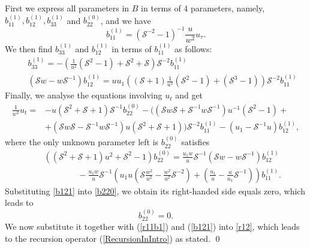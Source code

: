 \documentclass[fleqn,11pt,twoside]{article}
\makeatletter
\newcommand\cS{{\mathcal S}}
\renewenvironment{proof}[1][\proofname]{\par
  \normalfont
  \topsep6\p@\@plus6\p@ \trivlist
  \item[\hskip\labelsep\textbf{%
    #1\@addpunct{.}}]\ignorespaces
}{%
  \qed\endtrivlist
}
\theoremstyle{definition}
\makeatother
\begin{document}
\begin{proof}
First we express all parameters in $B$ in terms of 4 parameters, namely,
$b^{(1)}_{11},  b^{(1)}_{12},  b^{(1)}_{33}$ and $b^{(0)}_{22} $, and we have
\begin{equation}
 b^{(1)}_{11}= (\mathcal{S}^{-2}-1)^{-1}\frac{u}{w^2}u_\tau. \label{r11b1}
\end{equation}
We then find
$b^{(1)}_{33}$ and $b^{(1)}_{12}$ in terms of $b^{(1)}_{11}$ as follows:
		\begin{eqnarray}
&& b^{(1)}_{    33} =-\left(\frac{1}{u^2}
(\mathcal{S}^2-1)+\mathcal{S}^2+\mathcal{S}\right) \mathcal{S}^{-2} b^{(1)}_{11}\label{r11bis}\\
&&\left(\mathcal{S} w- w \mathcal{S}^{-1} \right)
b^{(1)}_{    1 2}= u u_1 \left( \left(\mathcal{S}+1\right)
\frac{1}{u^2}\left(\mathcal{S}^2-1\right)+\left(\mathcal{S}^3-1\right)\right)
\mathcal{S}^{-2} b^{(1)}_{11}\label{b121}
		\end{eqnarray}
Finally, we analyse the equations involving $u_t$ and get
		\begin{equation}
			\begin{split}
				\frac{1}{w^2} u_t= & -u\left(\mathcal{S}
^2+\mathcal{S} +1\right) \mathcal{\mathcal{S} }^{-1} b^{(0)}_{    22}   -\Big(\left(\cS w \cS + \cS^{-1} w \cS^{-1}\right)u^{-1} \left(\cS^2 -1\right)+\\ & + \left(\cS w \cS - \cS^{-1} w \cS^{-1}\right) u \left(\cS^2 + \cS + 1 \right)\Big)
\mathcal{\mathcal{S} }^{-2} b^{(1)}_{11} -\left(
{u_1}- \mathcal{S}^{-1} u\right) b^{(1)}_{    12},
			\end{split}
			\label{r12}
		\end{equation}
where the only unknown parameter left is $b^{(0)}_{22}$ satisfies
		\begin{eqnarray}
				&& \left(\left(\mathcal{S}^2+\mathcal{S}+1\right)
u^2+\mathcal{S}^2-1\right) b^{(0)}_{22} =\frac{{u_1} w}{u}\cS^{-1} \left(\mathcal{S} w - w
\mathcal{S}^{-1} \right) b^{(1)}_{12}\nonumber\\&&
\qquad \qquad
-\frac{ {u_1} w}{u} \cS^{-1} \left(u_1
{u} \left(\cS \frac{ {w}^2}{ {u}^2}-\frac{ {w}^2}{
{u}^2}\mathcal{S}^{-2}\right)  +
\left(\frac{u_1}{u}-\frac{u}{u_1}\mathcal{S}^{-1}\right) \right) b^{(1)}_{11} . \label{b220}
		\end{eqnarray}
Substituting \eqref{b121} into \eqref{b220}, we obtain its right-handed side equals zero,
which leads to
\begin{equation*}
b^{(0)}_{22} = 0 .
		\end{equation*}
We now substitute it together with (\ref{r11b1}) and (\ref{b121}) into \eqref{r12}, which leads to
the recursion operator (\ref{RecursionInIntro}) as stated.
\end{proof}
\end{document}
